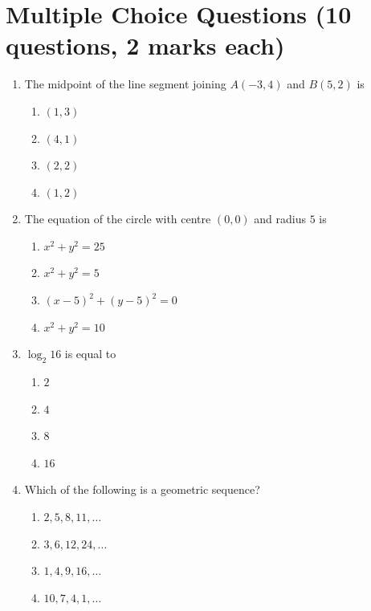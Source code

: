 \documentclass{../Templates/sbs-exam}
\begin{document}
\maketitle

\examnotice

\makemarksheet

\examtools

\newpage

\makeatletter

\section*{Multiple Choice Questions (10 questions, 2 marks each)}
\begin{enumerate}
    \item The midpoint of the line segment joining $A(-3,4)$ and $B(5,2)$ is
    \begin{enumerate}
        \item $(1,3)$
        \item $(4,1)$
        \item $(2,2)$
        \item $(1,2)$
    \end{enumerate}
    
    \item The equation of the circle with centre $(0,0)$ and radius $5$ is
    \begin{enumerate}
        \item $x^2 + y^2 = 25$
        \item $x^2 + y^2 = 5$
        \item $(x-5)^2 + (y-5)^2 = 0$
        \item $x^2 + y^2 = 10$
    \end{enumerate}
    
    \item $\log_2 16$ is equal to
    \begin{enumerate}
        \item $2$
        \item $4$
        \item $8$
        \item $16$
    \end{enumerate}
    
    \item Which of the following is a geometric sequence?
    \begin{enumerate}
        \item $2,5,8,11,\dots$
        \item $3,6,12,24,\dots$
        \item $1,4,9,16,\dots$
        \item $10,7,4,1,\dots$
    \end{enumerate}
    

\end{enumerate}
\end{document}

